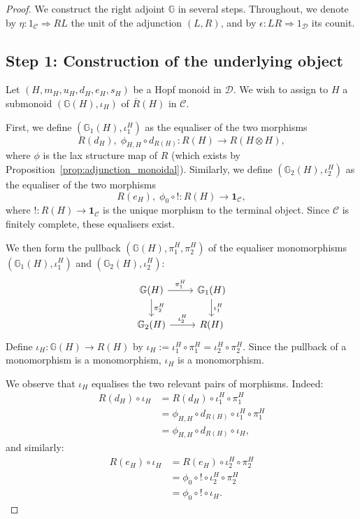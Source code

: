 \documentclass{amsart}
\begin{document}
\begin{proof}
We construct the right adjoint $\mathbb{G}$ in several steps. Throughout, we denote by $\eta \colon 1_{\mathcal{C}} \Rightarrow R L$ the unit of the adjunction $(L, R)$, and by $\epsilon \colon L R \Rightarrow 1_{\mathcal{D}}$ its counit.

\subsection*{Step 1: Construction of the underlying object}

Let $(H, m_H, u_H, d_H, e_H, s_H)$ be a Hopf monoid in $\mathcal{D}$. We wish to assign to $H$ a submonoid $(\mathbb{G}(H), \iota_H)$ of $\overline{R}(H)$ in $\mathcal{C}$.

First, we define $(\mathbb{G}_1(H), \iota^H_1)$ as the equaliser of the two morphisms
\[
R(d_H),\; \phi_{H,H} \circ d_{R(H)} \colon R(H) \longrightarrow R(H \otimes H),
\]
where $\phi$ is the lax structure map of $R$ (which exists by Proposition~\ref{prop:adjunction_monoidal}). Similarly, we define $(\mathbb{G}_2(H), \iota^H_2)$ as the equaliser of the two morphisms
\[
R(e_H),\; \phi_0 \circ ! \colon R(H) \longrightarrow \mathbf{1}_{\mathcal{C}},
\]
where $! \colon R(H) \to \mathbf{1}_{\mathcal{C}}$ is the unique morphism to the terminal object. Since $\mathcal{C}$ is finitely complete, these equalisers exist.

We then form the pullback $(\mathbb{G}(H), \pi^H_1, \pi^H_2)$ of the equaliser monomorphisms $(\mathbb{G}_1(H), \iota^H_1)$ and $(\mathbb{G}_2(H), \iota^H_2)$:
\[
\begin{tikzcd}
\mathbb{G}(H) \arrow{r}{\pi^H_1} \arrow{d}{\pi^H_2} &
\mathbb{G}_1(H) \arrow{d}{\iota^H_1} \\
\mathbb{G}_2(H) \arrow{r}{\iota^H_2} &
R(H)
\end{tikzcd}
\]
Define $\iota_H \colon \mathbb{G}(H) \longrightarrow R(H)$ by $\iota_H := \iota^H_1 \circ \pi^H_1 = \iota^H_2 \circ \pi^H_2$. Since the pullback of a monomorphism is a monomorphism, $\iota_H$ is a monomorphism.

We observe that $\iota_H$ equalises the two relevant pairs of morphisms. Indeed:
\begin{align*}
R(d_H) \circ \iota_H
&= R(d_H) \circ \iota^H_1 \circ \pi^H_1 \\
&= \phi_{H,H} \circ d_{R(H)} \circ \iota^H_1 \circ \pi^H_1 \\
&= \phi_{H,H} \circ d_{R(H)} \circ \iota_H,
\end{align*}
and similarly:
\begin{align*}
R(e_H) \circ \iota_H
&= R(e_H) \circ \iota^H_2 \circ \pi^H_2 \\
&= \phi_0 \circ ! \circ \iota^H_2 \circ \pi^H_2 \\
&= \phi_0 \circ ! \circ \iota_H.
\end{align*}


\end{proof}
\end{document}
